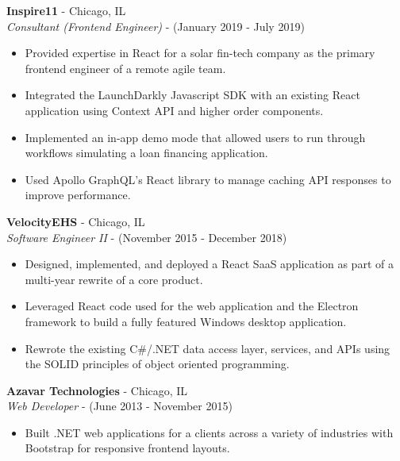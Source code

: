 \documentclass[11pt]{article}
\begin{document}
\begin{paracol}{2}
\noindent \textbf{Inspire11} - Chicago, IL \\
\textit{Consultant (Frontend Engineer)} - {\footnotesize{(January 2019 - July 2019)}} 
\begin{itemize}
    \item Provided expertise in React for a solar fin-tech company as the primary frontend engineer of a remote agile team.
    \item Integrated the LaunchDarkly Javascript SDK with an existing React application using Context API and higher order components.
    \item Implemented an in-app demo mode that allowed users to run through workflows simulating a loan financing application.
    \item Used Apollo GraphQL's React library to manage caching API responses to improve performance.
\end{itemize} 

\noindent \textbf{VelocityEHS} - Chicago, IL \\
\textit{Software Engineer II} - {\footnotesize{(November 2015 - December 2018)}}
\begin{itemize}
    \item Designed, implemented, and deployed a React SaaS application as part of a multi-year rewrite of a core product.
    \item Leveraged React code used for the web application and the Electron framework to build a fully featured Windows desktop application.
    \item Rewrote the existing C\#/.NET data access layer, services, and APIs using the SOLID principles of object oriented programming.
\end{itemize} 

\noindent \textbf{Azavar Technologies} - Chicago, IL \\
\textit{Web Developer} - {\footnotesize(June 2013 - November 2015)}
\begin{itemize}
    \item Built .NET web applications for a clients across a variety of industries with Bootstrap for responsive frontend layouts.
\end{itemize}
    
\end{paracol}
\end{document}
